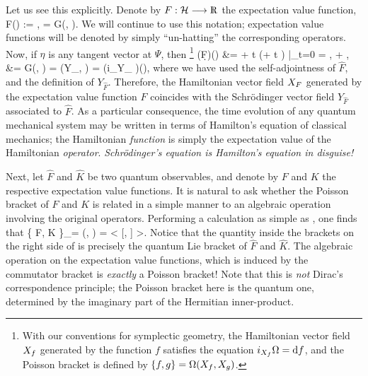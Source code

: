 Let us see this explicitly.  Denote by $F : \H \longrightarrow \R$ the
expectation value function,
%
\be
	F(\Psi) := \< \Psi, \Psi \> 
		 = G(\Psi, \Psi).
\ee
%
We will continue to use this notation; expectation value functions
will be denoted by simply ``un-hatting'' the corresponding operators.
Now, if $\eta$ is any tangent vector at $\Psi$, then%
%
\footnote{With our conventions for symplectic geometry, the
Hamiltonian vector field ${X_{f}}$ generated by the function $f$
satisfies the equation $i_{X_{f}}\Omega = {\mathrm d} f$, and the Poisson bracket
is defined by $\{f, g \} = \Omega({X_{f}}, {X_{g}})$.}
%
\ba
\label{SVF_is_HVF}
(\d F)(\eta) &=  \< \Psi + t\eta {}
(\Psi + t \eta) \> \big|_{t=0}
= \< \Psi, \eta \> + \< \eta, \Psi \>\nonumber \\
&=  G(\Psi, \eta)
= \W(Y_{}, \eta) = \big(i_{Y_{}} \W\big)(\eta),
\ea
%
where we have used the self-adjointness of $\hat{F}$,
 and the definition of $Y_{\hat{F}}$.  Therefore, the
Hamiltonian vector field ${X_{F}}$ generated by the expectation value
function $F$ coincides with the Schr\"odinger vector field
$Y_{\hat{F}}$ associated to $\hat{F}$.  As a particular consequence,
the time evolution of any quantum mechanical system may be written in
terms of Hamilton's equation of classical mechanics; the Hamiltonian
{\em function} is simply the expectation value of the Hamiltonian {\em
operator}.  {\em Schr\"odinger's equation is Hamilton's equation in
disguise!}

Next, let $\hat{F}$ and $\hat{K}$ be two quantum observables, and
denote by $F$ and $K$ the respective expectation value functions.  It
is natural to ask whether the Poisson bracket of $F$ and $K$ is
related in a simple manner to an algebraic operation involving the
original operators. Performing a calculation as simple as
, one finds that
%
\be \label{COMMUTATOR_is_PB}
\{ F, K \}_\W = \W(, )
= \bigg<  [, ] \bigg>.
\ee
%
Notice that the quantity inside the brackets on the right side of
 is precisely the quantum Lie bracket of
$\hat{F}$ and $\hat{K}$.  The algebraic operation on the expectation
value functions, which is induced by the commutator bracket is {\em
exactly} a Poisson bracket!  Note that this is {\em not} Dirac's
correspondence principle; the Poisson bracket here is the quantum one,
determined by the imaginary part of the Hermitian inner-product.

